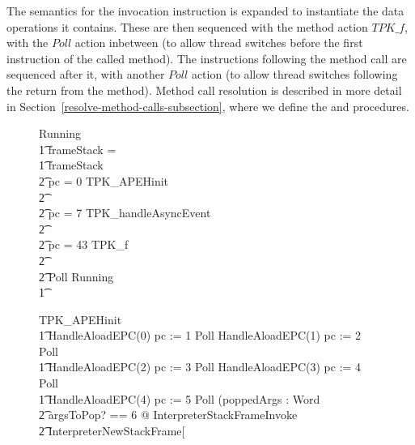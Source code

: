 The semantics for the invocation instruction is expanded to
instantiate the data operations it contains.
These are then sequenced with the method action $TPK\_f$, with the
$Poll$ action inbetween (to allow thread switches before the first
instruction of the called method).
The instructions following the method call are sequenced after it,
with another $Poll$ action (to allow thread switches following the
return from the method).
Method call resolution is described in more detail in
Section~\ref{resolve-method-calls-subsection}, where we define the
 and 
procedures.

\begin{figure}[t!]
  \setlength{\zedindent}{0cm}
  \setlength{\zedtab}{0.4cm}
  \setlength{\zedleftsep}{0.1cm}
  \begin{circus}
    Running \circdef \\
    \t1 \circif frameStack = \emptyset \circthen \Skip \\
    \t1 {} \circelse frameStack \neq \emptyset \circthen {} \\
    \t2 {} \circif pc = 0 \circthen TPK\_APEHinit \\
    \t2 {} \cdots {} \\
    \t2 {} \circelse pc = 7 \circthen TPK\_handleAsyncEvent \\
    \t2 {} \cdots {} \\
    \t2 {} \circelse pc = 43 \circthen TPK\_f \\
    \t2 {} \cdots {} \\
    \t2 \circfi \circseq Poll \circseq Running \\
    \t1 \circfi
  \end{circus}
  \vspace{-1cm}
  \begin{circus}
    TPK\_APEHinit \circdef \\
    \t1 HandleAloadEPC(0) \circseq pc := 1 \circseq Poll \circseq HandleAloadEPC(1) \circseq pc := 2 \circseq Poll \circseq \\
    \t1 HandleAloadEPC(2) \circseq pc := 3 \circseq Poll \circseq HandleAloadEPC(3) \circseq pc := 4 \circseq Poll \circseq \\
    \t1 HandleAloadEPC(4) \circseq pc := 5 \circseq Poll \circseq (\circvar poppedArgs : \seq Word \circspot \\
    \t2 \lschexpract \exists argsToPop? == 6 @ InterpreterStackFrameInvoke \rschexpract \circseq \\
    \t2 \lschexpract InterpreterNewStackFrame[\\

\end{circus}
\end{figure}

